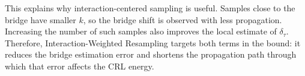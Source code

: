 This explains why interaction-centered sampling is useful. Samples close to the bridge have smaller $k$, so the bridge shift is observed with less propagation. Increasing the number of such samples also improves the local estimate of $\delta_{\tau}$. Therefore, Interaction-Weighted Resampling targets both terms in the bound: it reduces the bridge estimation error and shortens the propagation path through which that error affects the CRL energy.